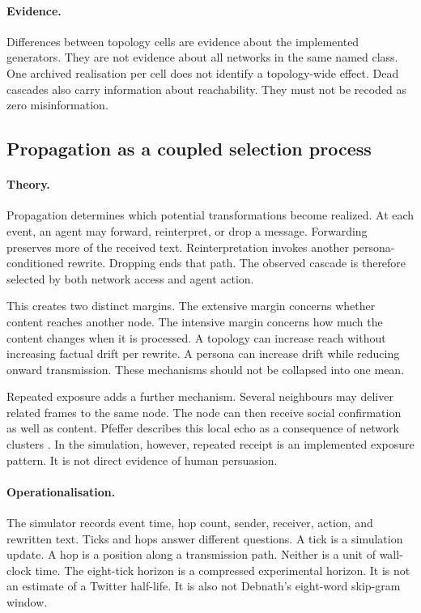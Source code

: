 \paragraph{Evidence.}
Differences between topology cells are evidence about the implemented generators.
They are not evidence about all networks in the same named class.
One archived realisation per cell does not identify a topology-wide effect.
Dead cascades also carry information about reachability.
They must not be recoded as zero misinformation.

\subsection{Propagation as a coupled selection process}
\label{subsec:propagation}

\paragraph{Theory.}
Propagation determines which potential transformations become realized.
At each event, an agent may forward, reinterpret, or drop a message.
Forwarding preserves more of the received text.
Reinterpretation invokes another persona-conditioned rewrite.
Dropping ends that path.
The observed cascade is therefore selected by both network access and agent action.

This creates two distinct margins.
The extensive margin concerns whether content reaches another node.
The intensive margin concerns how much the content changes when it is processed.
A topology can increase reach without increasing factual drift per rewrite.
A persona can increase drift while reducing onward transmission.
These mechanisms should not be collapsed into one mean.

Repeated exposure adds a further mechanism.
Several neighbours may deliver related frames to the same node.
The node can then receive social confirmation as well as content.
Pfeffer describes this local echo as a consequence of network clusters \parencite{pfeffer2014firestorms}.
In the simulation, however, repeated receipt is an implemented exposure pattern.
It is not direct evidence of human persuasion.

\paragraph{Operationalisation.}
The simulator records event time, hop count, sender, receiver, action, and rewritten text.
Ticks and hops answer different questions.
A tick is a simulation update.
A hop is a position along a transmission path.
Neither is a unit of wall-clock time.
The eight-tick horizon is a compressed experimental horizon.
It is not an estimate of a Twitter half-life.
It is also not Debnath's eight-word skip-gram window.

